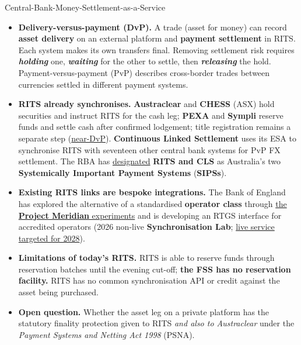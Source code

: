 \documentclass[aspectratio=169,12pt]{beamer}
\makeatletter
\newcommand{\rust}[1]{{\color{Rust}\bfseries\fontsize{\dimexpr\f@size pt+0.7pt\relax}{\f@baselineskip}\selectfont #1}}
\makeatother
\begin{document}
\begin{frame}[t]{Central-Bank-Money-Settlement-as-a-Service}
\fontsize{8.0}{10.0}\selectfont
\vspace{-0.1em}
  \vspace{0pt plus 0.35fill}\begin{itemize}\setlength{\itemsep}{2pt plus 2.4fill}
    \item \rust{Delivery-versus-payment (DvP).} A trade (asset for money) can record \textbf{asset delivery} on an external platform and \textbf{payment settlement} in RITS. Each system makes its own transfers final. Removing settlement risk requires \textbf{\emph{holding}} one, \textbf{\emph{waiting}} for the other to settle, then \textbf{\emph{releasing}} the hold. Payment-versus-payment (PvP) describes cross-border trades between currencies settled in different payment systems.
    \item \rust{RITS already synchronises.} \textbf{Austraclear} and \textbf{CHESS} (ASX) hold securities and instruct RITS for the cash leg; \textbf{PEXA} and \textbf{Sympli} reserve funds and settle cash after confirmed lodgement; title registration remains a separate step (\href{https://www.rba.gov.au/payments-and-infrastructure/tokenised-money/the-role-of-rits-in-supporting-settlement-in-a-tokenised-ecosystem/overview-of-current-rits-and-fss-functionality.html}{near-DvP}). \textbf{Continuous Linked Settlement} uses its ESA to synchronise RITS with seventeen other central bank systems for PvP FX settlement. The RBA has \href{https://www.rba.gov.au/payments-and-infrastructure/financial-market-infrastructure/high-value-payments/}{designated} \textcolor{Rust}{\textbf{RITS and CLS}} as Australia's two \textbf{Systemically Important Payment Systems} (\textbf{SIPSs}).
    \item \rust{Existing RITS links are bespoke integrations.} The Bank of England has explored the alternative of a standardised \textbf{operator class} through \href{https://www.bankofengland.co.uk/payments/rtgs-future-roadmap/what-is-synchro}{the \textbf{Project Meridian} experiments} and is developing an RTGS interface for accredited operators (2026 non-live \textbf{Synchronisation Lab}; \href{https://www.bankofengland.co.uk/payments/payments-innovation/wholesale-experiments-programme}{live service targeted for 2028}).
    \item \rust{Limitations of today's RITS.} RITS is able to reserve funds through reservation batches until the evening cut-off; \textbf{the FSS has no reservation facility.} RITS has no common synchronisation API or credit against the asset being purchased.
    \item \rust{Open question.} Whether the asset leg on a private platform has the statutory finality protection given to RITS \emph{and also to Austraclear} under the \emph{Payment Systems and Netting Act 1998} (PSNA).
  \end{itemize}\vspace{0pt plus 4fill}
\end{frame}
\end{document}
